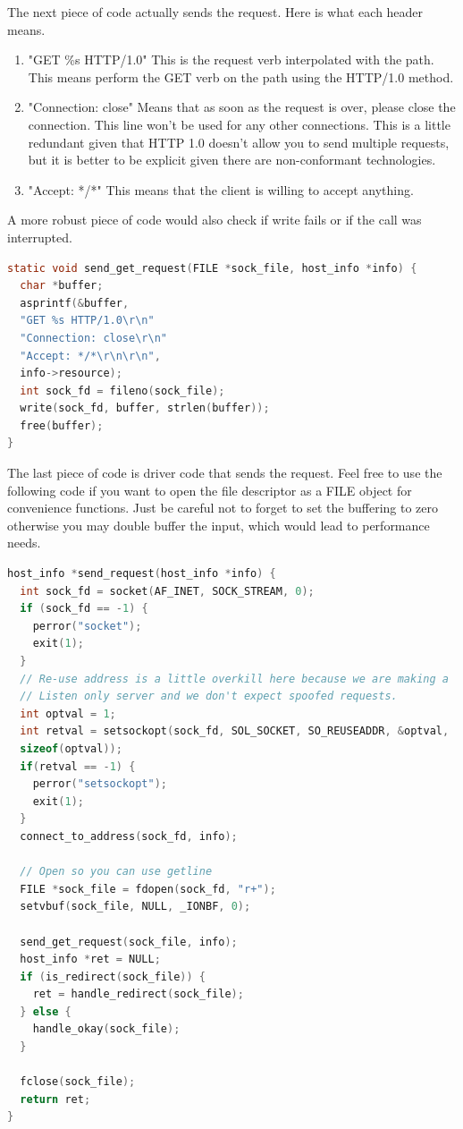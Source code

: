 The next piece of code actually sends the request. Here is what each header means.

\begin{enumerate}
  \item "GET \%s HTTP/1.0" This is the request verb interpolated with the path. This means perform the GET verb on the path using the HTTP/1.0 method.
  \item "Connection: close" Means that as soon as the request is over, please close the connection. This line won't be used for any other connections.
    This is a little redundant given that HTTP 1.0 doesn't allow you to send multiple requests, but it is better to be explicit given there are non-conformant technologies.
  \item "Accept: */*" This means that the client is willing to accept anything.
\end{enumerate}

A more robust piece of code would also check if write fails or if the call was interrupted.

\begin{lstlisting}[language=C]
static void send_get_request(FILE *sock_file, host_info *info) {
  char *buffer;
  asprintf(&buffer,
  "GET %s HTTP/1.0\r\n"
  "Connection: close\r\n"
  "Accept: */*\r\n\r\n",
  info->resource);
  int sock_fd = fileno(sock_file);
  write(sock_fd, buffer, strlen(buffer));
  free(buffer);
}
\end{lstlisting}

The last piece of code is driver code that sends the request.
Feel free to use the following code if you want to open the file descriptor as a FILE object for convenience functions.
Just be careful not to forget to set the buffering to zero otherwise you may double buffer the input, which would lead to performance needs.

\begin{lstlisting}[language=C]
host_info *send_request(host_info *info) {
  int sock_fd = socket(AF_INET, SOCK_STREAM, 0);
  if (sock_fd == -1) {
    perror("socket");
    exit(1);
  }
  // Re-use address is a little overkill here because we are making a
  // Listen only server and we don't expect spoofed requests.
  int optval = 1;
  int retval = setsockopt(sock_fd, SOL_SOCKET, SO_REUSEADDR, &optval,
  sizeof(optval));
  if(retval == -1) {
    perror("setsockopt");
    exit(1);
  }
  connect_to_address(sock_fd, info);

  // Open so you can use getline
  FILE *sock_file = fdopen(sock_fd, "r+");
  setvbuf(sock_file, NULL, _IONBF, 0);

  send_get_request(sock_file, info);
  host_info *ret = NULL;
  if (is_redirect(sock_file)) {
    ret = handle_redirect(sock_file);
  } else {
    handle_okay(sock_file);
  }

  fclose(sock_file);
  return ret;
}
\end{lstlisting}

